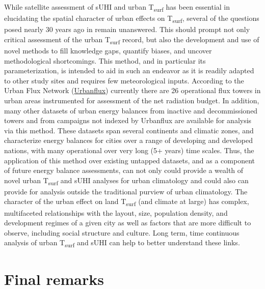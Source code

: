 \begin{bibunit}
While satellite assessment of sUHI and urban T\textsubscript{surf} has been essential in elucidating the spatial character of urban effects on T\textsubscript{surf}, several of the questions posed nearly 30 years ago in \citet{Roth1989} remain unanswered. This should prompt not only critical assessment of the urban T\textsubscript{surf} record, but also the development and use of novel methods to fill knowledge gaps, quantify biases, and uncover methodological shortcomings. This method, and in particular its parameterization, is intended to aid in such an endeavor as it is readily adapted to other study sites and requires few meteorological inputs. According to the Urban Flux Network (\href{http://fluxnet.fluxdata.org/}{Urbanflux}) currently there are 26 operational flux towers in urban areas instrumented for assessment of the net radiation budget. In addition, many other datasets of urban energy balances from inactive and decommissioned towers and from campaigns not indexed by Urbanflux are available for analysis via this method. These datasets span several continents and climatic zones, and characterize energy balances for cities over a range of developing and developed nations, with many operational over very long (5+ years) time scales. Thus, the application of this method over existing untapped datasets, and as a component of future energy balance assessments, can not only could provide a wealth of novel urban T\textsubscript{surf} and sUHI analyses for urban climatology and could also can provide for analysis outside the traditional purview of urban climatology. The character of the urban effect on land T\textsubscript{surf} (and climate at large) has complex, multifaceted relationships with the layout, size, population density, and development regimes of a given city as well as factors that are more difficult to observe, including social structure and culture. Long term, time continuous analysis of urban T\textsubscript{surf} and sUHI can help to better understand these links. 

\section{Final remarks}



\end{bibunit}
